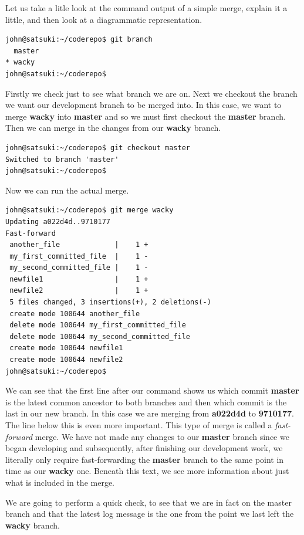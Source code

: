 Let us take a litle look at the command output of a simple merge, explain it a little, and then look at a diagrammatic representation.

\begin{Verbatim}
john@satsuki:~/coderepo$ git branch
  master
* wacky
john@satsuki:~/coderepo$ 
\end{Verbatim}

Firstly we check just to see what branch we are on.  Next we checkout the branch we want our development branch to be merged into.  In this case, we want to merge \textbf{wacky} into \textbf{master} and so we must first checkout the \textbf{master} branch.  Then we can merge in the changes from our \textbf{wacky} branch.

\begin{Verbatim}
john@satsuki:~/coderepo$ git checkout master
Switched to branch 'master'
john@satsuki:~/coderepo$ 
\end{Verbatim}

Now we can run the actual merge.

\begin{Verbatim}
john@satsuki:~/coderepo$ git merge wacky 
Updating a022d4d..9710177
Fast-forward
 another_file             |    1 +
 my_first_committed_file  |    1 -
 my_second_committed_file |    1 -
 newfile1                 |    1 +
 newfile2                 |    1 +
 5 files changed, 3 insertions(+), 2 deletions(-)
 create mode 100644 another_file
 delete mode 100644 my_first_committed_file
 delete mode 100644 my_second_committed_file
 create mode 100644 newfile1
 create mode 100644 newfile2
john@satsuki:~/coderepo$ 
\end{Verbatim} 

We can see that the first line after our  command shows us which commit \textbf{master} is the latest common ancestor to both branches and then which commit is the last in our new branch.  In this case we are merging from \textbf{a022d4d} to \textbf{9710177}.  The line below this is even more important.  This type of merge is called a \emph{fast-forward} merge.  We have not made any changes to our \textbf{master} branch since we began developing and subsequently, after finishing our development work, we literally only require fast-forwarding the \textbf{master} branch to the same point in time as our \textbf{wacky} one.  Beneath this text, we see more information about just what is included in the merge.  

We are going to perform a quick check, to see that we are in fact on the master branch and that the latest log message is the one from the point we last left the \textbf{wacky} branch.

